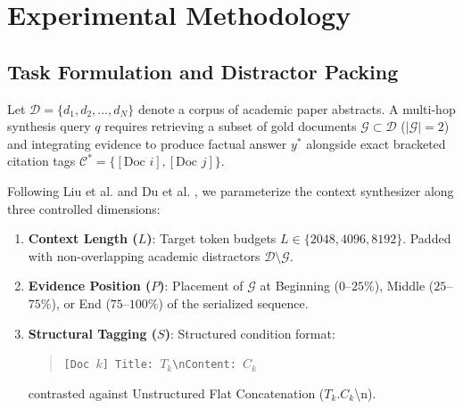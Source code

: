 \documentclass[manuscript,screen,oneside]{acmart}
\begin{document}
\section{Experimental Methodology}\label{sec:method}

\subsection{Task Formulation and Distractor Packing}
Let $\mathcal{D} = \{d_1, d_2, \dots, d_N\}$ denote a corpus of academic paper abstracts. A multi-hop synthesis query $q$ requires retrieving a subset of gold documents $\mathcal{G} \subset \mathcal{D}$ ($|\mathcal{G}| = 2$) and integrating evidence to produce factual answer $y^*$ alongside exact bracketed citation tags $\mathcal{C}^* = \{[\text{Doc } i], [\text{Doc } j]\}$.

Following Liu et al. \cite{liu2024lost} and Du et al. \cite{du2025contextlength}, we parameterize the context synthesizer along three controlled dimensions:
\begin{enumerate}
    \item \textbf{Context Length ($L$)}: Target token budgets $L \in \{2048, 4096, 8192\}$. Padded with non-overlapping academic distractors $\mathcal{D} \setminus \mathcal{G}$.
    \item \textbf{Evidence Position ($P$)}: Placement of $\mathcal{G}$ at Beginning ($0$--$25\%$), Middle ($25$--$75\%$), or End ($75$--$100\%$) of the serialized sequence.
    \item \textbf{Structural Tagging ($S$)}: Structured condition format:
    \begin{quote}
    \texttt{[Doc $k$] Title: $T_k$\textbackslash nContent: $C_k$}
    \end{quote}
    contrasted against Unstructured Flat Concatenation ($T_k. C_k$\textbackslash n).
\end{enumerate}
\end{document}
